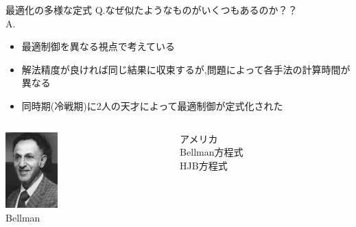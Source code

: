 \documentclass[twocolumn, dvipdfmx,12pt]{beamer}
\begin{document}
    \begin{frame}{最適化の多様な定式}
        \scriptsize
        Q.なぜ似たようなものがいくつもあるのか？？\\

        A.\begin{itemize}
            \item 最適制御を異なる視点で考えている
            \item 解法精度が良ければ同じ結果に収束するが,問題によって各手法の計算時間が異なる
            \item 同時期(冷戦期)に2人の天才によって最適制御が定式化された
        \end{itemize}

        \vspace{5mm}

        \begin{columns}

            \begin{column}{0.5\textwidth}
                \begin{boxnote}
                    \begin{columns}
                        \begin{column}{.5\textwidth}
                            \includegraphics[clip, width = 2.0cm]{Bellman.png}\\
                            {\tiny Bellman}
                            \centering
                        \end{column}
                        \begin{column}{.5\textwidth}
                            アメリカ\\
                            \vspace{1em}
                            Bellman方程式 \\
                            HJB方程式 \\
                        \end{column}
                    \end{columns}
                \end{boxnote}
            \end{column}


\end{columns}
\end{frame}
\end{document}
